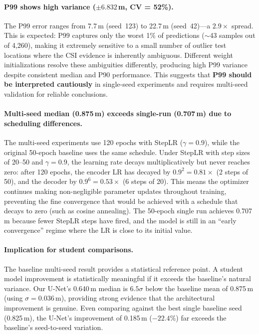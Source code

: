 \documentclass[11pt,a4paper]{article}
\begin{document}
\paragraph{P99 shows high variance ($\pm 6.832$\,m, CV = 52\%).}
The P99 error ranges from 7.7\,m (seed~123) to 22.7\,m (seed~42)---a $2.9\times$ spread.
This is expected: P99 captures only the worst 1\% of predictions ($\sim$43 samples out of 4{,}260), making it extremely sensitive to a small number of outlier test locations where the CSI evidence is inherently ambiguous.
Different weight initializations resolve these ambiguities differently, producing high P99 variance despite consistent median and P90 performance.
This suggests that \textbf{P99 should be interpreted cautiously} in single-seed experiments and requires multi-seed validation for reliable conclusions.

\paragraph{Multi-seed median (0.875\,m) exceeds single-run (0.707\,m) due to scheduling differences.}
The multi-seed experiments use 120 epochs with StepLR ($\gamma = 0.9$), while the original 50-epoch baseline uses the same schedule.
Under StepLR with step sizes of 20--50 and $\gamma = 0.9$, the learning rate decays multiplicatively but never reaches zero: after 120 epochs, the encoder LR has decayed by $0.9^{2} = 0.81\times$ (2 steps of 50), and the decoder by $0.9^{6} = 0.53\times$ (6 steps of 20).
This means the optimizer continues making non-negligible parameter updates throughout training, preventing the fine convergence that would be achieved with a schedule that decays to zero (such as cosine annealing).
The 50-epoch single run achieves 0.707\,m because fewer StepLR steps have fired, and the model is still in an ``early convergence'' regime where the LR is close to its initial value.

\paragraph{Implication for student comparisons.}
The baseline multi-seed result provides a statistical reference point.
A student model improvement is statistically meaningful if it exceeds the baseline's natural variance.
Our U-Net's 0.640\,m median is $6.5\sigma$ below the baseline mean of 0.875\,m (using $\sigma = 0.036$\,m), providing strong evidence that the architectural improvement is genuine.
Even comparing against the best single baseline seed (0.825\,m), the U-Net's improvement of 0.185\,m ($-22.4\%$) far exceeds the baseline's seed-to-seed variation.
\end{document}
